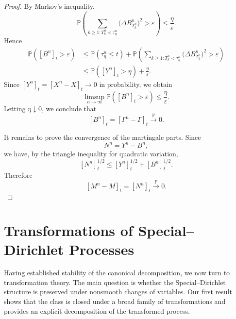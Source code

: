 \documentclass[a4paper,10pt]{article}
\begin{document}
\begin{proof}
By Markov's inequality,
\[
\mathbb P\!\left(
        \sum_{k\ge1:T^n_k<\tau^n_\eta}
        \bigl(\Delta B^n_{T^n_k}\bigr)^2
        >\varepsilon
        \right)
        \le
        \frac{\eta}{\varepsilon}.
\]
Hence
\[
\begin{aligned}
\mathbb P\!\left([B^n]_t>\varepsilon\right)
&\le
\mathbb P(\tau^n_\eta\le t)
+
\mathbb P\!\left(
        \sum_{k\ge1:T^n_k<\tau^n_\eta}
        \bigl(\Delta B^n_{T^n_k}\bigr)^2
        >\varepsilon
        \right)
\\
&\le
\mathbb P([Y^n]_t>\eta)
+
\frac{\eta}{\varepsilon}.
\end{aligned}
\]
Since \([Y^n]_t=[X^n-X]_t\to0\) in probability, we obtain
\[
        \limsup_{n\to\infty}
        \mathbb P\!\left([B^n]_t>\varepsilon\right)
        \le
        \frac{\eta}{\varepsilon}.
\]
Letting \(\eta\downarrow0\), we conclude that
\[
        [B^n]_t=[\Gamma^n-\Gamma]_t
        \xrightarrow{\mathbb P}0 .
\]

It remains to prove the convergence of the martingale parts. Since
\[
        N^n=Y^n-B^n,
\]
we have, by the triangle inequality for quadratic variation,
\[
        [N^n]_t^{1/2}
        \le
        [Y^n]_t^{1/2}
        +
        [B^n]_t^{1/2}.
\]
Therefore
\[
        [M^n-M]_t=[N^n]_t
        \xrightarrow{\mathbb P}0 .
\]
\end{proof}



















\section{Transformations of Special–Dirichlet Processes}
Having established stability of the canonical decomposition, we now
turn to transformation theory.
The main question is whether the Special--Dirichlet structure is
preserved under nonsmooth changes of variables.
Our first result shows that the class is closed under a broad family
of transformations and provides an explicit decomposition of the
transformed process. 
\end{document}
